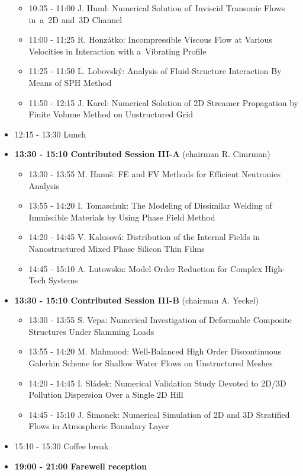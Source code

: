 \documentclass[10pt, A4]{article}%
\begin{document}
\begin{itemize}
\begin{itemize}
    \item 10:35 - 11:00 J. Huml: Numerical Solution of~Inviscid Transonic Flows in~a~2D and~3D Channel
    \item 11:00 - 11:25 R. Honz\'atko: Incompressible Viscous Flow at Various Velocities in Interaction with a~Vibrating Profile
    \item 11:25 - 11:50 L. Lobovsk\'y: Analysis of Fluid-Structure Interaction By Means of SPH Method
    \item 11:50 - 12:15 J. Karel: Numerical Solution of 2D Streamer Propagation by Finite Volume Method on
  Unstructured Grid
  \end{itemize}
  \item 12:15 - 13:30 Lunch
  \item {\bf 13:30 - 15:10 Contributed Session III-A} (chairman R. Cimrman) 
  \begin{itemize}
    \item 13:30 - 13:55 M. Hanu\v{s}: FE and FV Methods for Efficient Neutronics Analysis
    \item 13:55 - 14:20 I. Tomaschuk: The Modeling of Dissimilar Welding of Immiscible Materials by Using Phase Field Method
    \item 14:20 - 14:45 V. Kalusov\'a: Distribution of the Internal Fields in Nanostructured Mixed Phase
Silicon Thin Films
    \item 14:45 - 15:10 A. Lutowska: Model Order Reduction for Complex High-Tech Systems
  \end{itemize}
  \item {\bf 13:30 - 15:10 Contributed Session III-B} (chairman A. Yeckel) 
  \begin{itemize}
    \item 13:30 - 13:55 S. Vepa: Numerical Investigation of Deformable Composite Structures Under Slamming Loads
    \item 13:55 - 14:20 M. Mahmood: Well-Balanced High Order Discontinuous Galerkin Scheme for Shallow Water Flows on Unstructured Meshes
    \item 14:20 - 14:45 I. Sl\'adek: Numerical Validation Study Devoted to 2D/3D Pollution Dispersion Over a Single 2D Hill
    \item 14:45 - 15:10 J. \v Simonek: Numerical Simulation of 2D and 3D Stratified Flows in Atmospheric Boundary Layer
  \end{itemize}
  \item 15:10 - 15:30 Coffee break
  \item {\bf 19:00 - 21:00 Farewell reception} 
\end{itemize}
\end{document}
